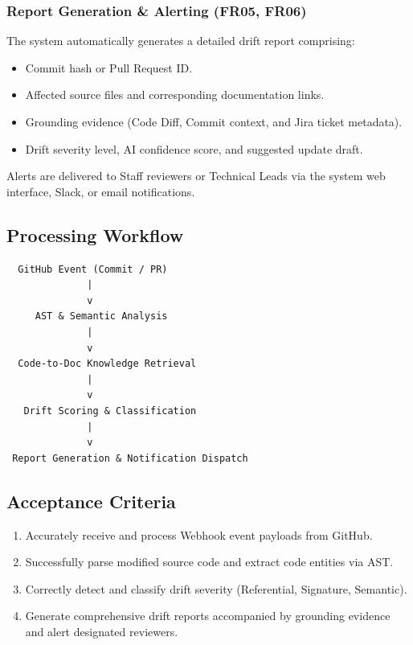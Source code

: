 \subsubsection{Report Generation \& Alerting (FR05, FR06)}
The system automatically generates a detailed drift report comprising:
\begin{itemize}
    \item Commit hash or Pull Request ID.
    \item Affected source files and corresponding documentation links.
    \item Grounding evidence (Code Diff, Commit context, and Jira ticket metadata).
    \item Drift severity level, AI confidence score, and suggested update draft.
\end{itemize}
Alerts are delivered to Staff reviewers or Technical Leads via the system web interface, Slack, or email notifications.

\subsection{Processing Workflow}
\begin{verbatim}
  GitHub Event (Commit / PR)
              |
              v
     AST & Semantic Analysis
              |
              v
  Code-to-Doc Knowledge Retrieval
              |
              v
   Drift Scoring & Classification
              |
              v
 Report Generation & Notification Dispatch
\end{verbatim}

\subsection{Acceptance Criteria}
\begin{enumerate}
    \item Accurately receive and process Webhook event payloads from GitHub.
    \item Successfully parse modified source code and extract code entities via AST.
    \item Correctly detect and classify drift severity (Referential, Signature, Semantic).
    \item Generate comprehensive drift reports accompanied by grounding evidence and alert designated reviewers.
\end{enumerate}